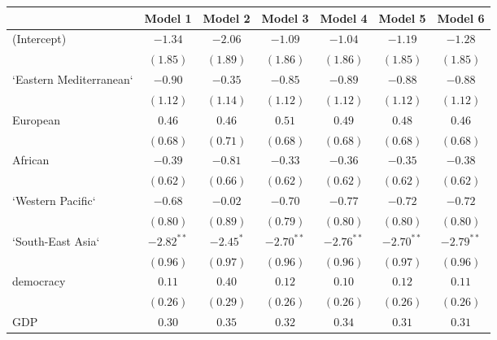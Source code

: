 
\begin{table}[!h]
\begin{center}
\begin{tabular}{l c c c c c c }
\toprule
 & Model 1 & Model 2 & Model 3 & Model 4 & Model 5 & Model 6 \\
\midrule
(Intercept)             & $-1.34$      & $-2.06$      & $-1.09$      & $-1.04$      & $-1.19$      & $-1.28$      \\
                        & $(1.85)$     & $(1.89)$     & $(1.86)$     & $(1.86)$     & $(1.85)$     & $(1.85)$     \\
`Eastern Mediterranean` & $-0.90$      & $-0.35$      & $-0.85$      & $-0.89$      & $-0.88$      & $-0.88$      \\
                        & $(1.12)$     & $(1.14)$     & $(1.12)$     & $(1.12)$     & $(1.12)$     & $(1.12)$     \\
European                & $0.46$       & $0.46$       & $0.51$       & $0.49$       & $0.48$       & $0.46$       \\
                        & $(0.68)$     & $(0.71)$     & $(0.68)$     & $(0.68)$     & $(0.68)$     & $(0.68)$     \\
African                 & $-0.39$      & $-0.81$      & $-0.33$      & $-0.36$      & $-0.35$      & $-0.38$      \\
                        & $(0.62)$     & $(0.66)$     & $(0.62)$     & $(0.62)$     & $(0.62)$     & $(0.62)$     \\
`Western Pacific`       & $-0.68$      & $-0.02$      & $-0.70$      & $-0.77$      & $-0.72$      & $-0.72$      \\
                        & $(0.80)$     & $(0.89)$     & $(0.79)$     & $(0.80)$     & $(0.80)$     & $(0.80)$     \\
`South-East Asia`       & $-2.82^{**}$ & $-2.45^{*}$  & $-2.70^{**}$ & $-2.76^{**}$ & $-2.70^{**}$ & $-2.79^{**}$ \\
                        & $(0.96)$     & $(0.97)$     & $(0.96)$     & $(0.96)$     & $(0.97)$     & $(0.96)$     \\
democracy               & $0.11$       & $0.40$       & $0.12$       & $0.10$       & $0.12$       & $0.11$       \\
                        & $(0.26)$     & $(0.29)$     & $(0.26)$     & $(0.26)$     & $(0.26)$     & $(0.26)$     \\
GDP                     & $0.30$       & $0.35$       & $0.32$       & $0.34$       & $0.31$       & $0.31$       \\

\end{tabular}
\end{center}
\end{table}

